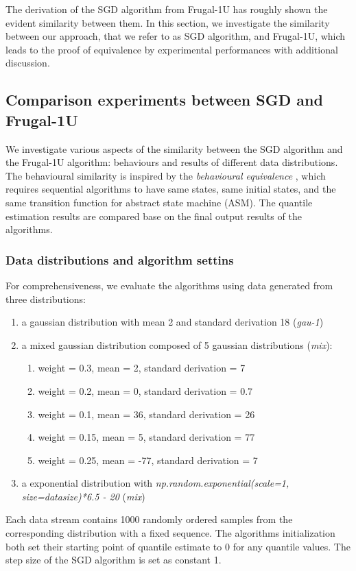 The derivation of the SGD algorithm from Frugal-1U has roughly shown the evident similarity between them. In this section, we investigate the similarity between our approach, that we refer to as SGD algorithm, and Frugal-1U, which leads to the proof of equivalence by experimental performances with additional discussion.

\subsection{Comparison experiments between SGD and Frugal-1U}

We investigate various aspects of the similarity between the SGD algorithm and the Frugal-1U algorithm: behaviours and results of different data distributions. The behavioural similarity is inspired by the \textit{behavioural equivalence} \cite{gurevichSequentialAbstractstateMachines2000}, which requires sequential algorithms to have same states, same initial states, and the same transition function for abstract state machine (ASM). The quantile estimation results are compared base on the final output results of the algorithms.

\subsubsection{Data distributions and algorithm settins}

For comprehensiveness, we evaluate the algorithms using data generated from three distributions:
    \begin{enumerate}
        \item a gaussian distribution with mean 2 and standard derivation 18 (\textit{gau-1})
        \item a mixed gaussian distribution composed of 5 gaussian distributions (\textit{mix}):
            \begin{enumerate}
                \item weight = 0.3, mean = 2, standard derivation = 7
                \item weight = 0.2, mean = 0, standard derivation = 0.7
                \item weight = 0.1, mean = 36, standard derivation = 26
                \item weight = 0.15, mean = 5, standard derivation = 77
                \item weight = 0.25, mean = -77, standard derivation = 7
            \end{enumerate}
            \item a exponential distribution with \textit{np.random.exponential(scale=1, size=datasize)*6.5 - 20} (\textit{mix})
    \end{enumerate}
Each data stream contains 1000 randomly ordered samples from the corresponding distribution with a fixed sequence. The algorithms initialization both set their starting point of quantile estimate to $0$ for any quantile values. The step size of the SGD algorithm is set as constant 1.


